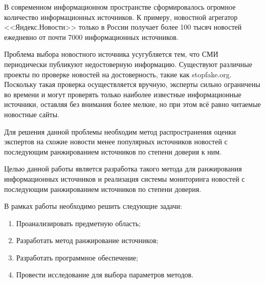 \Introduction

В современном информационном пространстве сформировалось огромное количество информационных источников. К примеру, новостной агрегатор <<Яндекс.Новости>> только в России получает более 100 тысяч новостей ежедневно от почти 7000 информационных источников.

Проблема выбора новостного источника усугубляется тем, что СМИ периодически публикуют недостоверную информацию. Существуют различные проекты по проверке новостей на достоверность, такие как stopfake.org. Поскольку такая проверка осуществляется вручную, эксперты сильно ограничены во времени и могут проверять только наиболее известные информационные источники, оставляя без внимания более мелкие, но при этом всё равно читаемые новостные сайты.

Для решения данной проблемы необходим метод распространения оценки экспертов на схожие новости менее популярных источников новостей с последующим ранжированием источников по степени доверия к ним.

Целью данной работы является разработка такого метода для ранжирования информационных источников и реализация системы мониторинга новостей с последующим ранжированием источников по степени доверия.

В рамках работы необходимо решить следующие задачи:
\begin{enumerate}
    \item Проанализировать предметную область;
    \item Разработать метод ранжирование источников;
    \item Разработать программное обеспечение;
    \item Провести исследование для выбора параметров методов.
\end{enumerate}
